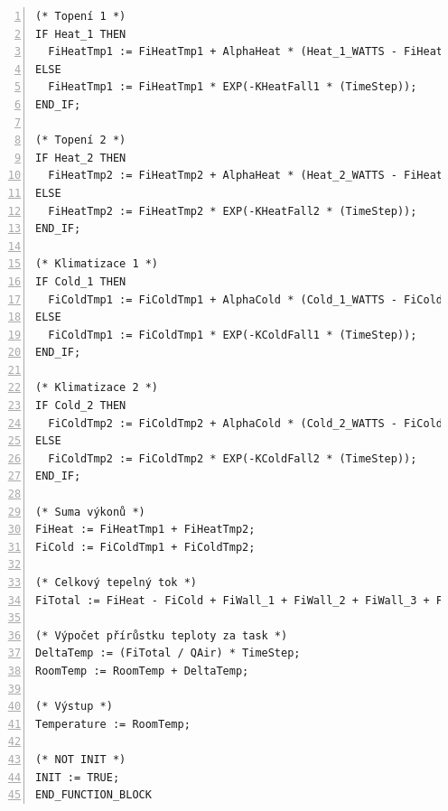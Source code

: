 \begin{lstlisting}[language=ST, breaklines=true, numbers=left, numberstyle=\small, numbersep=10pt, frame=single, basicstyle=\ttfamily\small, caption={Definice funkčního bloku fbRoomTempMod}, label={lst:fbRoomTempMod}]
(* Topení 1 *)
IF Heat_1 THEN
  FiHeatTmp1 := FiHeatTmp1 + AlphaHeat * (Heat_1_WATTS - FiHeatTmp1);
ELSE
  FiHeatTmp1 := FiHeatTmp1 * EXP(-KHeatFall1 * (TimeStep));
END_IF;

(* Topení 2 *)
IF Heat_2 THEN
  FiHeatTmp2 := FiHeatTmp2 + AlphaHeat * (Heat_2_WATTS - FiHeatTmp2);
ELSE
  FiHeatTmp2 := FiHeatTmp2 * EXP(-KHeatFall2 * (TimeStep));
END_IF;

(* Klimatizace 1 *)
IF Cold_1 THEN
  FiColdTmp1 := FiColdTmp1 + AlphaCold * (Cold_1_WATTS - FiColdTmp1);
ELSE
  FiColdTmp1 := FiColdTmp1 * EXP(-KColdFall1 * (TimeStep));
END_IF;

(* Klimatizace 2 *)
IF Cold_2 THEN
  FiColdTmp2 := FiColdTmp2 + AlphaCold * (Cold_2_WATTS - FiColdTmp2);
ELSE
  FiColdTmp2 := FiColdTmp2 * EXP(-KColdFall2 * (TimeStep));
END_IF;

(* Suma výkonů *)
FiHeat := FiHeatTmp1 + FiHeatTmp2;
FiCold := FiColdTmp1 + FiColdTmp2;

(* Celkový tepelný tok *)
FiTotal := FiHeat - FiCold + FiWall_1 + FiWall_2 + FiWall_3 + FiWall_4 + FiFloor + FiCeiling;

(* Výpočet přírůstku teploty za task *)
DeltaTemp := (FiTotal / QAir) * TimeStep;
RoomTemp := RoomTemp + DeltaTemp;

(* Výstup *)
Temperature := RoomTemp;

(* NOT INIT *)
INIT := TRUE;
END_FUNCTION_BLOCK
\end{lstlisting}
\newpage
